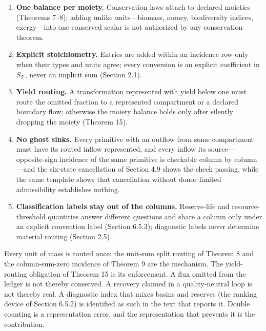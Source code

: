 \documentclass[11pt]{article}
\providecommand{\tightlist}{\setlength{\itemsep}{0pt}\setlength{\parskip}{0pt}}
\begin{document}
\begin{enumerate}
\def\labelenumi{\arabic{enumi}.}
\tightlist
\item
  \textbf{One balance per moiety.} Conservation laws attach to declared
  moieties (Theorems 7--8); adding unlike units---biomass, money,
  biodiversity indices, exergy---into one conserved scalar is not
  authorized by any conservation theorem.
\item
  \textbf{Explicit stoichiometry.} Entries are added within an incidence
  row only when their types and units agree; every conversion is an
  explicit coefficient in \(S_{\mathcal{T}}\), never an implicit sum
  (Section 2.1).
\item
  \textbf{Yield routing.} A transformation represented with yield below
  one must route the omitted fraction to a represented compartment or a
  declared boundary flow; otherwise the moiety balance holds only after
  silently dropping the moiety (Theorem 15).
\item
  \textbf{No ghost sinks.} Every primitive with an outflow from some
  compartment must have its routed inflow represented, and every inflow
  its source---opposite-sign incidence of the same primitive is
  checkable column by column---and the six-state cancellation of
  Section 4.9 shows the check passing, while the same template shows
  that cancellation without donor-limited admissibility establishes
  nothing.
\item
  \textbf{Classification labels stay out of the columns.} Reserve-life
  and resource-threshold quantities answer different questions and share
  a column only under an explicit convention label (Section 6.5.3);
  diagnostic labels never determine material routing (Section 2.5).
\end{enumerate}

Every unit of mass is routed once: the unit-sum split routing of Theorem 8 and the column-sum-zero incidence of Theorem 9 are the mechanism. The yield-routing obligation of Theorem 15 is its enforcement. A flux omitted from the ledger is not thereby conserved. A recovery claimed in a quality-neutral loop is not thereby real. A diagnostic index that mixes basins and reserves (the ranking device of Section 6.5.2) is identified as such in the text that reports it. Double counting is a representation error, and the representation that prevents it is the contribution.
\end{document}
